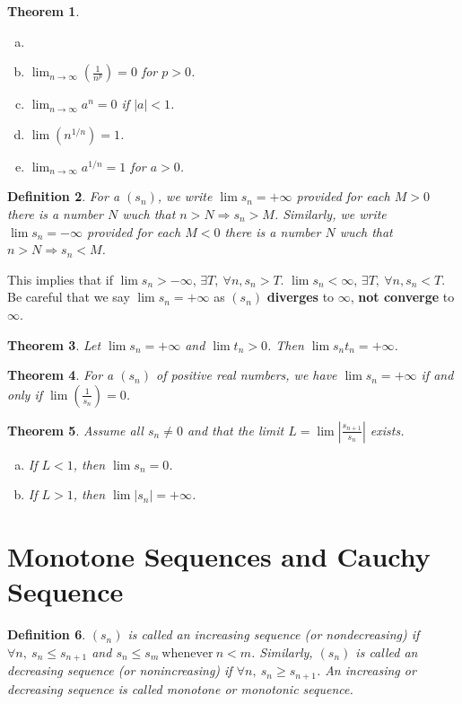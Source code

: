 \documentclass[12pt, lettersize]{book}
\newtheorem{thm}{Theorem}[section]
\newtheorem{dfn}[thm]{Definition}
\begin{document}
	\begin{thm}
		\begin{enumerate}[(a)]
			\item[]
			\item $\lim_{n\rightarrow\infty}(\frac{1}{n^p})=0$ for $p>0$.
			\item $\lim_{n\rightarrow\infty}a^n=0$ if $|a|<1$.
			\item $\lim(n^{1/n})=1$.
			\item $\lim_{n\rightarrow\infty}a^{1/n}=1$ for $a>0$.
		\end{enumerate}
	\end{thm}
	
	\begin{dfn}
		For a $(s_n)$, we write $\lim s_n=+\infty$ provided for each $M>0$ there is a number $N$ wuch that $n>N\Rightarrow s_n>M$. Similarly, we write $\lim s_n=-\infty$ provided for each $M<0$ there is a number $N$ wuch that $n>N\Rightarrow s_n<M$.
	\end{dfn}
	This implies that if $\lim s_n>-\infty$, $\exists T,\ \forall n, s_n>T$. $\lim s_n<\infty$, $\exists T,\ \forall n, s_n<T$. 
	Be careful that we say $\lim s_n=+\infty$ as $(s_n)$ \textbf{diverges} to $\infty$, \textbf{not converge} to $\infty$.
	
	
	\begin{thm}
		Let $\lim s_n=+\infty$ and $\lim t_n>0$. Then $\lim s_nt_n=+\infty$.
	\end{thm}
	
	
	\begin{thm}
		For a $(s_n)$ of \emph{positive} real numbers, we have $\lim s_n=+\infty$ if and only if $\lim(\frac{1}{s_n})=0$.
	\end{thm}
	
	\begin{thm}
		Assume all $s_n\neq0$ and that the limit $L=\lim\left|\frac{s_{n+1}}{s_n}\right|$ exists.
		\begin{enumerate}[(a)]
			\item If $L<1$, then $\lim s_n=0$.
			\item If $L>1$, then $\lim |s_n|=+\infty$.
		\end{enumerate} 
	\end{thm}
	
	\newpage
	\section{Monotone Sequences and Cauchy Sequence}
	\begin{dfn}
		$(s_n)$ is called an \emph{increasing sequence (or nondecreasing)} if $\forall n,\ s_n\leq s_{n+1}$ and $s_n\leq s_m\ \text{whenever}\ n<m$.
		Similarly, $(s_n)$ is called an \emph{decreasing sequence (or nonincreasing)} if $\forall n,\ s_n\geq s_{n+1}$. An increasing or decreasing sequence is called \emph{monotone} or \emph{monotonic} sequence.
	\end{dfn}
	
\end{document}
